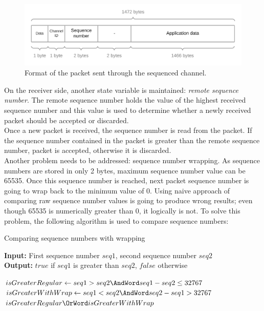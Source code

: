 \documentclass[times, utf8, diplomski]{fer}
\begin{document}
\begin{figure}[h!]
	\centering
	\includegraphics[scale=0.2]{Sequenced-packet-structure}
	\caption{Format of the packet sent through the sequenced channel.}
	\label{fig:sequenced-packet-structure}
\end{figure}

On the receiver side, another state variable is maintained: \textit{remote sequence number}. The remote sequence number holds the value of the highest received sequence number and this value is used to determine whether a newly received packet should be accepted or discarded. \\

Once a new packet is received, the sequence number is read from the packet. If the sequence number contained in the packet is greater than the remote sequence number, packet is accepted, otherwise it is discarded. \\

Another problem needs to be addressed: sequence number wrapping. As sequence numbers are stored in only 2 bytes, maximum sequence number value can be 65535. Once this sequence number is reached, next packet sequence number is going to wrap back to the minimum value of 0. Using naive approach of comparing raw sequence number values is going to produce wrong results; even though 65535 is numerically greater than 0, it logically is not. To solve this problem, the following algorithm is used to compare sequence numbers:

\begin{algorithm}[H]
	\caption{Comparing sequence numbers with wrapping}
	\textbf{Input:} First sequence number $seq1$, second sequence number $seq2$ \\
	\textbf{Output:} $true$ if $seq1$ is greater than $seq2$, $false$ otherwise \\
	
	\begin{algorithmic}
		\State $isGreaterRegular \gets seq1 > seq2 \AndWord seq1 - seq2 \leq 32767$
		\State $isGreaterWithWrap \gets seq1 < seq2 \AndWord seq2 - seq1 > 32767$ \\
		\Return $isGreaterRegular \OrWord isGreaterWithWrap$
	\end{algorithmic}
\end{algorithm}
\end{document}

